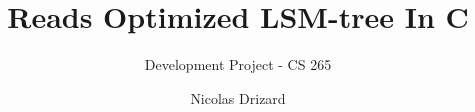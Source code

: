 \documentclass{sig-alternate-05-2015}
\begin{document}






%

\title{Reads Optimized LSM-tree In C}
\subtitle{Development Project - CS 265}
%
%
%
%
%

%
\author{
%
%
\alignauthor
Nicolas Drizard\\
       \\
}
\end{document}
